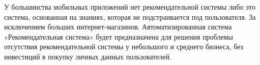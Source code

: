 У большинства мобильных приложений нет рекомендательной системы либо это система, основанная на знаниях,
которая не подстраивается под пользователя.
За исключением больших интернет-магазинов.
Автоматизированная система «Рекомендательная система» будет предназначена для решения проблемы отсутствия
рекомендательной системы у небольшого и среднего бизнеса, без инвестиций в покупку личных данных пользователей.
